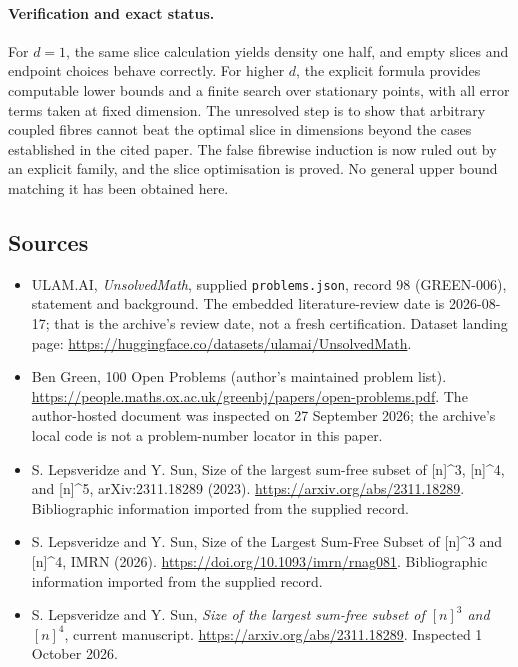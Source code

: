 \documentclass[11pt,a4paper]{article}
\begin{document}
\paragraph{Verification and exact status.}
For $d=1$, the same slice calculation yields density one half, and empty slices and endpoint choices behave correctly. For higher $d$, the explicit formula provides computable lower bounds and a finite search over stationary points, with all error terms taken at fixed dimension. The unresolved step is to show that arbitrary coupled fibres cannot beat the optimal slice in dimensions beyond the cases established in the cited paper. The false fibrewise induction is now ruled out by an explicit family, and the slice optimisation is proved. No general upper bound matching it has been obtained here.

\subsection{Sources}

{\small

\begin{itemize}

\item[\hypertarget{source:98:1}{S1}] ULAM.AI, \emph{UnsolvedMath}, supplied \texttt{problems.json}, record 98 (GREEN-006), statement and background. The embedded literature-review date is 2026-08-17; that is the archive’s review date, not a fresh certification. Dataset landing page: \url{https://huggingface.co/datasets/ulamai/UnsolvedMath}.

\item[\hypertarget{source:98:2}{S2}] Ben Green, 100 Open Problems (author’s maintained problem list). \url{https://people.maths.ox.ac.uk/greenbj/papers/open-problems.pdf}. The author-hosted document was inspected on 27 September 2026; the archive’s local code is not a problem-number locator in this paper.

\item[\hypertarget{source:98:3}{S3}] S. Lepsveridze and Y. Sun, Size of the largest sum-free subset of [n]\textasciicircum{}3, [n]\textasciicircum{}4, and [n]\textasciicircum{}5, arXiv:2311.18289 (2023). \url{https://arxiv.org/abs/2311.18289}. Bibliographic information imported from the supplied record.

\item[\hypertarget{source:98:4}{S4}] S. Lepsveridze and Y. Sun, Size of the Largest Sum-Free Subset of [n]\textasciicircum{}3 and [n]\textasciicircum{}4, IMRN (2026). \url{https://doi.org/10.1093/imrn/rnag081}. Bibliographic information imported from the supplied record.

\item[E1] S. Lepsveridze and Y. Sun, \emph{Size of the largest sum-free subset of $[n]^3$ and $[n]^4$}, current manuscript. \url{https://arxiv.org/abs/2311.18289}. Inspected 1 October 2026.

\end{itemize}

}

\label{end:98}
\end{document}
